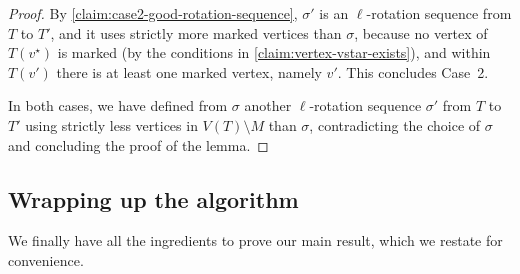 \documentclass[a4paper,UKenglish,cleveref, autoref, thm-restate]{lipics-v2021}
\begin{document}
\begin{proof}
By \autoref{claim:case2-good-rotation-sequence},
$\sigma'$ is an $\ell$-rotation sequence from $T$ to $T'$, and it uses strictly more marked vertices than $\sigma$, because no vertex of $T(v^{\star})$ is marked (by the conditions in \autoref{claim:vertex-vstar-exists}), and within $T(v')$ there is at least one marked vertex, namely $v'$. This concludes Case~2.

\medskip

In both cases, we have defined from $\sigma$ another $\ell$-rotation sequence $\sigma'$ from $T$ to $T'$ using strictly less vertices in $V(T) \setminus M$ than $\sigma$, contradicting the choice of $\sigma$ and concluding the proof of the lemma.
\end{proof}






















\subsection{Wrapping up the algorithm}
\label{sec:wrapping-up}

We finally have all the ingredients to prove our main result, which we restate for convenience.

\maintheorem*
\end{document}
